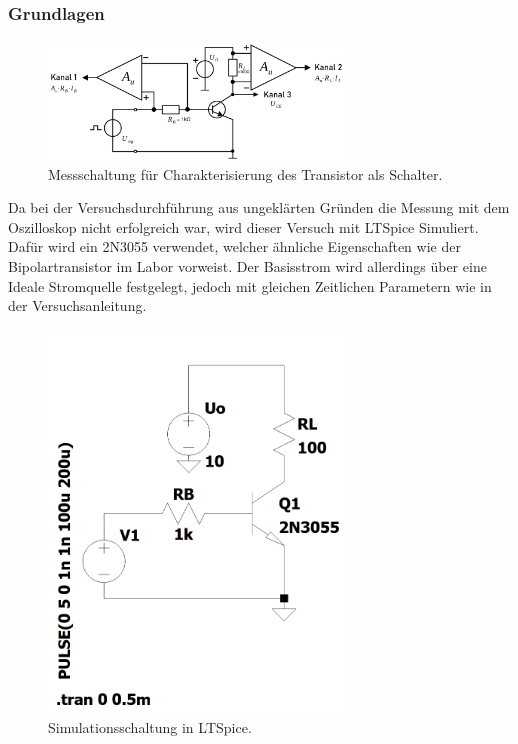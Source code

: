 \documentclass[
	a4paper, %
	12pt, %
]{CSUniSchoolLabReport}
\begin{document}
\subsubsection{Grundlagen}
\begin{figure}[H]
	\centering
	\includegraphics[width=0.7\textwidth]{Figures/MessschaltungSchaltanwendung.png}
	\caption{Messschaltung für Charakterisierung des Transistor als Schalter.}
	\label{fig:MessschaltungSchaltanwendung}
\end{figure}
Da bei der Versuchsdurchführung aus ungeklärten Gründen die Messung mit dem Oszilloskop nicht erfolgreich war, wird dieser Versuch mit LTSpice Simuliert. Dafür wird ein 2N3055 verwendet, welcher ähnliche Eigenschaften wie der Bipolartransistor im Labor vorweist.  
Der Basisstrom wird allerdings über eine Ideale Stromquelle festgelegt, jedoch mit gleichen Zeitlichen Parametern wie in der Versuchsanleitung.
\begin{figure}[H]
	\centering
	\includegraphics[width=0.7\textwidth]{Figures/LTSpiceSchaltung.png}
	\caption{Simulationsschaltung in LTSpice.}
	\label{fig:LTSpiceSchaltung}
\end{figure}
\end{document}
